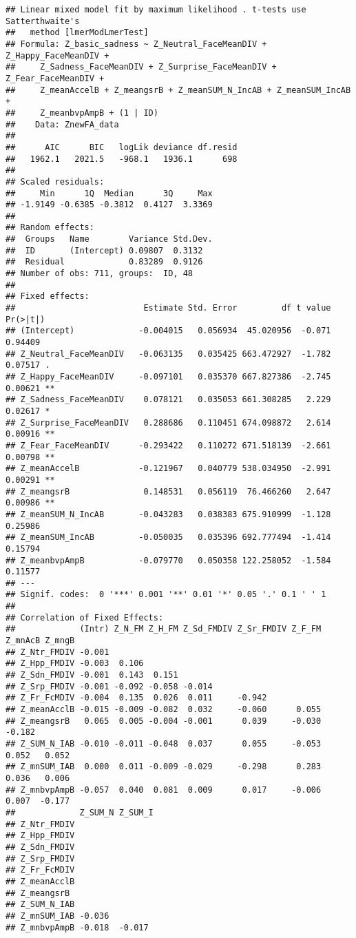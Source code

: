 \documentclass[
]{article}
\begin{document}
\begin{verbatim}
## Linear mixed model fit by maximum likelihood . t-tests use Satterthwaite's
##   method [lmerModLmerTest]
## Formula: Z_basic_sadness ~ Z_Neutral_FaceMeanDIV + Z_Happy_FaceMeanDIV +  
##     Z_Sadness_FaceMeanDIV + Z_Surprise_FaceMeanDIV + Z_Fear_FaceMeanDIV +  
##     Z_meanAccelB + Z_meangsrB + Z_meanSUM_N_IncAB + Z_meanSUM_IncAB +  
##     Z_meanbvpAmpB + (1 | ID)
##    Data: ZnewFA_data
## 
##      AIC      BIC   logLik deviance df.resid 
##   1962.1   2021.5   -968.1   1936.1      698 
## 
## Scaled residuals: 
##     Min      1Q  Median      3Q     Max 
## -1.9149 -0.6385 -0.3812  0.4127  3.3369 
## 
## Random effects:
##  Groups   Name        Variance Std.Dev.
##  ID       (Intercept) 0.09807  0.3132  
##  Residual             0.83289  0.9126  
## Number of obs: 711, groups:  ID, 48
## 
## Fixed effects:
##                          Estimate Std. Error         df t value Pr(>|t|)   
## (Intercept)             -0.004015   0.056934  45.020956  -0.071  0.94409   
## Z_Neutral_FaceMeanDIV   -0.063135   0.035425 663.472927  -1.782  0.07517 . 
## Z_Happy_FaceMeanDIV     -0.097101   0.035370 667.827386  -2.745  0.00621 **
## Z_Sadness_FaceMeanDIV    0.078121   0.035053 661.308285   2.229  0.02617 * 
## Z_Surprise_FaceMeanDIV   0.288686   0.110451 674.098872   2.614  0.00916 **
## Z_Fear_FaceMeanDIV      -0.293422   0.110272 671.518139  -2.661  0.00798 **
## Z_meanAccelB            -0.121967   0.040779 538.034950  -2.991  0.00291 **
## Z_meangsrB               0.148531   0.056119  76.466260   2.647  0.00986 **
## Z_meanSUM_N_IncAB       -0.043283   0.038383 675.910999  -1.128  0.25986   
## Z_meanSUM_IncAB         -0.050035   0.035396 692.777494  -1.414  0.15794   
## Z_meanbvpAmpB           -0.079770   0.050358 122.258052  -1.584  0.11577   
## ---
## Signif. codes:  0 '***' 0.001 '**' 0.01 '*' 0.05 '.' 0.1 ' ' 1
## 
## Correlation of Fixed Effects:
##             (Intr) Z_N_FM Z_H_FM Z_Sd_FMDIV Z_Sr_FMDIV Z_F_FM Z_mnAcB Z_mngB
## Z_Ntr_FMDIV -0.001                                                          
## Z_Hpp_FMDIV -0.003  0.106                                                   
## Z_Sdn_FMDIV -0.001  0.143  0.151                                            
## Z_Srp_FMDIV -0.001 -0.092 -0.058 -0.014                                     
## Z_Fr_FcMDIV -0.004  0.135  0.026  0.011     -0.942                          
## Z_meanAcclB -0.015 -0.009 -0.082  0.032     -0.060      0.055               
## Z_meangsrB   0.065  0.005 -0.004 -0.001      0.039     -0.030 -0.182        
## Z_SUM_N_IAB -0.010 -0.011 -0.048  0.037      0.055     -0.053  0.052   0.052
## Z_mnSUM_IAB  0.000  0.011 -0.009 -0.029     -0.298      0.283  0.036   0.006
## Z_mnbvpAmpB -0.057  0.040  0.081  0.009      0.017     -0.006  0.007  -0.177
##             Z_SUM_N Z_SUM_I
## Z_Ntr_FMDIV                
## Z_Hpp_FMDIV                
## Z_Sdn_FMDIV                
## Z_Srp_FMDIV                
## Z_Fr_FcMDIV                
## Z_meanAcclB                
## Z_meangsrB                 
## Z_SUM_N_IAB                
## Z_mnSUM_IAB -0.036         
## Z_mnbvpAmpB -0.018  -0.017
\end{verbatim}
\end{document}
